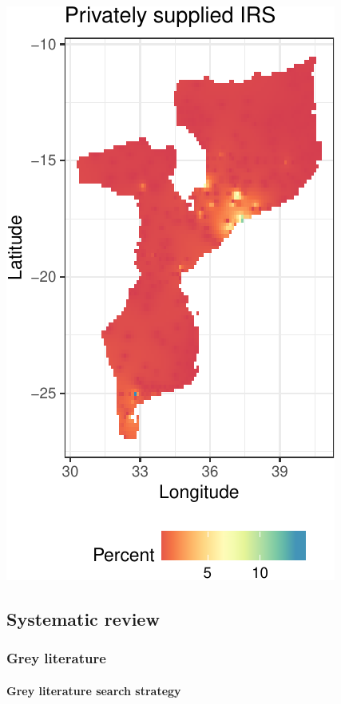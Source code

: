 \documentclass[]{article}
\let\oldparagraph\paragraph
\renewcommand{\paragraph}[1]{\oldparagraph{#1}\mbox{}}
\begin{document}
\begin{center}\includegraphics{figures/unnamed-chunk-16-1} \end{center}

\subsection{Systematic review}\label{systematic-review-1}

\subsubsection{Grey literature}\label{grey-literature-1}

\paragraph{Grey literature search
strategy}\label{grey-literature-search-strategy}
\end{document}
